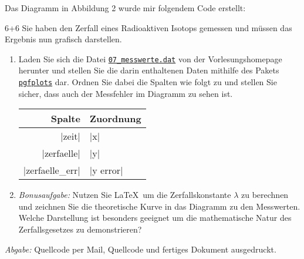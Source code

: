 \documentclass{scrartcl}
\newcommand{\abgabe}[1]{\par\noindent\textit{Abgabe:} #1}
\newcommand{\pkg}[1]{\href{http://ctan.org/pkg/#1}{\texttt{#1}}}
\begin{document}
\newsavebox{\SolutionCodeB}
\begin{lrbox}{\SolutionCodeB}
\begin{minipage}{\textwidth}

\end{minipage}
\end{lrbox}

\newpage
\begin{solution}
Das Diagramm in Abbildung 2 wurde mir folgendem Code erstellt:\\
\noindent\usebox\SolutionCodeB
\end{solution}



\begin{question}[subtitle=Zerfallsprozess (Aufgabe für Physiker*innen)]{6+6}
Sie haben den Zerfall eines Radioaktiven Isotops gemessen und müssen das Ergebnis nun grafisch darstellen. 
\begin{enumerate}[label=\alph*)]
\item Laden Sie sich die Datei \href{http://latexkurs.de/uebungen/07_messwerte.dat}{\texttt{07\_messwerte.dat}} von der Vorlesungshomepage herunter und stellen Sie die darin enthaltenen Daten mithilfe des Pakets \pkg{pgfplots} dar. Ordnen Sie dabei die Spalten wie folgt zu und stellen Sie sicher, dass auch der Messfehler im Diagramm zu sehen ist.
\begin{center}
\begin{tabular}{rl}
\toprule
\textbf{Spalte} & \textbf{Zuordnung}\\
\midrule
|zeit| & |x| \\
|zerfaelle| & |y| \\
|zerfaelle\_err| & |y error|\\
\bottomrule
\end{tabular}
\end{center}
\item \emph{Bonusaufgabe:} Nutzen Sie \LaTeX\ um die Zerfallskonstante $\lambda$ zu berechnen und zeichnen Sie die theoretische Kurve in das Diagramm zu den Messwerten. Welche Darstellung ist besonders geeignet um die mathematische Natur des Zerfallsgesetzes zu demonstrieren?

\end{enumerate}
	\abgabe{Quellcode per Mail{,} Quellcode und fertiges Dokument ausgedruckt.}
\end{question}
 
\end{document}
